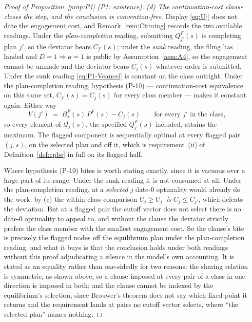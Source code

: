 \begin{proof}[Proof of Proposition~\ref{prop:P1} (P1: existence)]
\emph{(d) The continuation-cost clause closes the step, and the conclusion is convention-free.}
Display \eqref{eq:Uj} does not date the engagement cost, and Remark~\ref{rem:Ctiming} records the two
available readings. Under the \emph{plan-completion} reading, submitting $Q_{j'}^F(s)$ is completing
plan $j'$, so the deviator bears $C_{j'}(s)$; under the \emph{sunk} reading, the filing has landed
and $D = 1 \Rightarrow a = 1$ is public by Assumption~\ref{asm:A4}, so the engagement cannot be
unmade and the deviator bears $C_j(s)$ whatever order is submitted. Under the sunk reading
\eqref{eq:P1-Vcancel} is constant on the class outright. Under the plan-completion reading,
hypothesis (P-10) --- continuation-cost equivalence on this same set, $C_{j'}(s) = C_j(s)$ for every
class member --- makes it constant again. Either way
\[
V(j') \;=\; B_j^F(s)\,P^F(s) - C_j(s)
\qquad \text{for every } j' \text{ in the class,}
\]
so every element of $\mathcal Q_j(s)$, the specified $Q_j^F(s)$ included, attains the maximum. The
flagged component is sequentially optimal at every flagged pair $(j,s)$, on the selected plan and off
it, which is requirement~(ii) of Definition~\ref{def:cpbe} in full on its flagged half.

Where hypothesis (P-10) bites is worth stating exactly, since it is vacuous over a large part of its
range. Under the sunk reading it is not consumed at all. Under the plan-completion reading, at a
\emph{selected} $j$ date-$0$ optimality would already do the work: by (c) the within-class comparison
$U_j \ge U_{j'}$ \emph{is} $C_j \le C_{j'}$, which defeats the deviation. But at a flagged pair the
cutoff vector does not select there is no date-$0$ optimality to appeal to, and without the clause the
deviator strictly prefers the class member with the smallest engagement cost. So the clause's bite is
precisely the flagged nodes off the equilibrium plan under the plan-completion reading, and what it
buys is that the conclusion holds under both readings without this proof adjudicating a silence in
the model's own accounting. It is stated as an equality rather than one-sidedly for two reasons: the
sharing relation is symmetric, as shown above, so a clause imposed at every pair of a class in one
direction is imposed in both; and the clause cannot be indexed by the equilibrium's selection, since
Brouwer's theorem does not say which fixed point it returns and the requirement lands at pairs no
cutoff vector selects, where ``the selected plan'' names nothing.


\end{proof}
